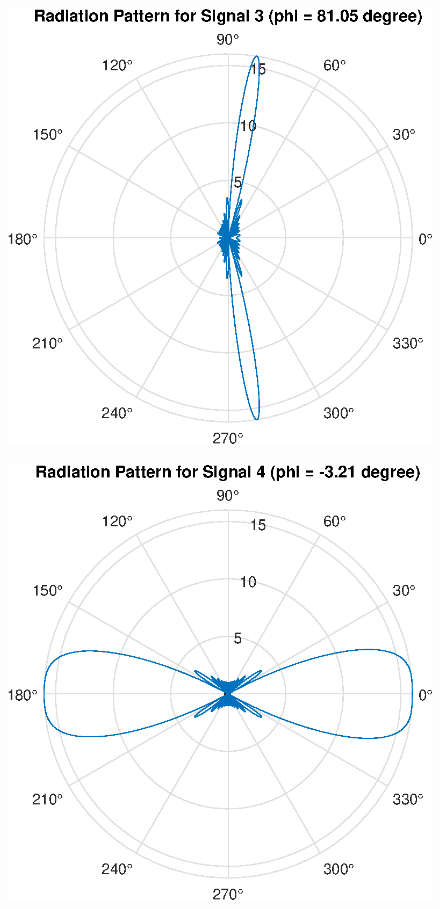 \begin{figure}[H]
    \centering
    \includegraphics[scale = 0.7]{s3.eps}
\end{figure}
\begin{figure}[H]
    \centering
    \includegraphics[scale = 0.7]{s4.eps}
\end{figure}
